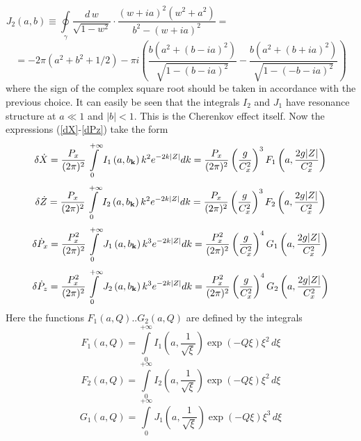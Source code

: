 $$
J_2(a,b)\equiv \oint\limits_\gamma\frac{d\,w}{\sqrt{1-w^2}}\cdot
\frac{(w+ia)^2(w^2+a^2)}{b^2-(w+ia)^2}=
\qquad\qquad\qquad\qquad\qquad\qquad\quad
$$
\begin{equation}
=-2\pi(a^2+b^2+1/2)-\pi i\left(
\frac{b(a^2+(b-ia)^2)}{\sqrt{1-(b-ia)^2}}-
\frac{b(a^2+(b+ia)^2)}{\sqrt{1-(-b-ia)^2}}
\right)
\end{equation}
where the sign of the complex square root should be taken 
in accordance with the previous choice. 
It can easily be seen that the integrals $I_2$ and $J_1$ have resonance
structure at $a\ll 1$ and $|b|<1$. This is the Cherenkov effect itself.
Now the expressions (\ref{dX}-\ref{dPz}) take the form
\begin{equation}\label{dX2}
\delta \dot X=\frac{P_x}{(2\pi)^2}\int\limits_0^{+\infty}
I_1\left(a,b_{\bf k}\right)k^2e^{-2k|Z|}dk=
\frac{P_x}{(2\pi)^2}\left(\frac{g}{C_x^2}\right)^3 
F_1\left(a,\frac{2g|Z|}{C_x^2}\right)
\end{equation}
\begin{equation}\label{dZ2}
\delta \dot Z=\frac{P_x}{(2\pi)^2}\int\limits_0^{+\infty}
I_2\left(a,b_{\bf k}\right)k^2e^{-2k|Z|}dk=
\frac{P_x}{(2\pi)^2}\left(\frac{g}{C_x^2}\right)^3 
F_2\left(a,\frac{2g|Z|}{C_x^2}\right)
\end{equation}
\begin{equation}\label{dPx2}
\delta \dot P_x=\frac{P_x^2}{(2\pi)^2}\int\limits_0^{+\infty}
J_1\left(a,b_{\bf k}\right)k^3e^{-2k|Z|}dk=
\frac{P_x^2}{(2\pi)^2}\left(\frac{g}{C_x^2}\right)^4 
G_1\left(a,\frac{2g|Z|}{C_x^2}\right)
\end{equation}
\begin{equation}\label{dPz2}
\delta \dot P_z=\frac{P_x^2}{(2\pi)^2}\int\limits_0^{+\infty}
J_2\left(a,b_{\bf k}\right)k^3e^{-2k|Z|}dk=
\frac{P_x^2}{(2\pi)^2}\left(\frac{g}{C_x^2}\right)^4 
G_2\left(a,\frac{2g|Z|}{C_x^2}\right)
\end{equation}
Here the functions $F_1(a,Q)..G_2(a,Q)$ are defined by the integrals
\begin{equation}\label{F1}
F_1(a,Q)=\int\limits_0^{+\infty}I_1\left(a,\frac{1}{\sqrt{\xi}}\right)
\exp\left(-Q\xi\right)\xi^2\,d\xi
\end{equation}
\begin{equation}\label{F2}
F_2(a,Q)=\int\limits_0^{+\infty}I_2\left(a,\frac{1}{\sqrt{\xi}}\right)
\exp\left(-Q\xi\right)\xi^2\,d\xi
\end{equation}
\begin{equation}\label{G1}
G_1(a,Q)=\int\limits_0^{+\infty}J_1\left(a,\frac{1}{\sqrt{\xi}}\right)
\exp\left(-Q\xi\right)\xi^3\,d\xi
\end{equation}
